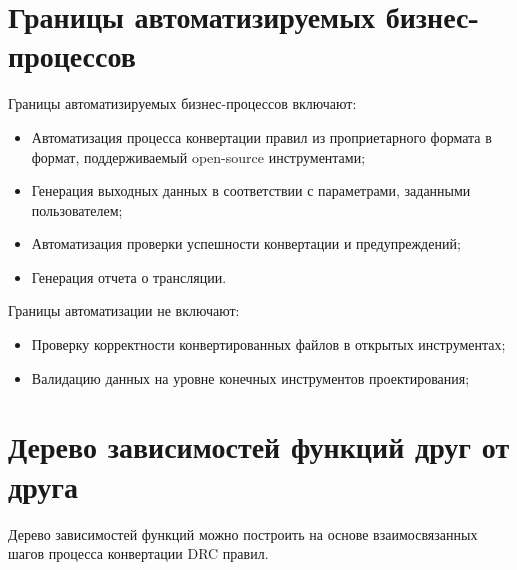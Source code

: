 \section{Границы автоматизируемых бизнес-процессов}

Границы автоматизируемых бизнес-процессов включают:

\begin{itemize}
	\item Автоматизация процесса конвертации правил
		из проприетарного формата в формат,
		поддерживаемый open-source инструментами;
	\item Генерация выходных данных в соответствии с параметрами,
		заданными пользователем;
	\item Автоматизация проверки успешности конвертации и предупреждений;
	\item Генерация отчета о трансляции.
\end{itemize}

Границы автоматизации не включают:

\begin{itemize}
	\item Проверку корректности конвертированных файлов
		в открытых инструментах;
	\item Валидацию данных на уровне конечных инструментов проектирования;
\end{itemize}

\section{Дерево зависимостей функций друг от друга}

Дерево зависимостей функций можно построить на основе взаимосвязанных
шагов процесса конвертации DRC правил.

